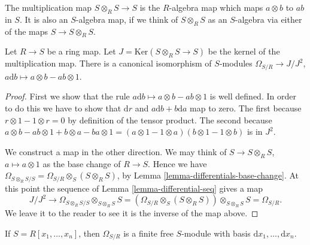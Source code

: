 \noindent
The multiplication map $S\otimes_R S \to S$ is the $R$-algebra
map which maps $a \otimes b$ to $ab$ in $S$. It is also an
$S$-algebra map, if we think of $S\otimes_R S$ as an $S$-algebra
via either of the maps $S \to S\otimes_R S$.

\begin{lemma}
\label{lemma-differentials-diagonal}
Let $R \to S$ be a ring map. Let $J = \text{Ker}(S\otimes_R S \to S)$
be the kernel of the multiplication map. There is a canonical
isomorphism of $S$-modules $\Omega_{S/R} \to J/J^2$,
$a \text{d} b \mapsto a\otimes b - ab\otimes 1$.
\end{lemma}

\begin{proof}
First we show that the rule $a \text{d} b \mapsto a\otimes b - ab\otimes 1$
is well defined. In order to do this we have to show
that $\text{d}r$ and $a\text{d}b + b \text{d}a$ map to zero.
The first because $r\otimes 1 - 1 \otimes r = 0$ by definition
of the tensor product. The second because
$a\otimes b - ab\otimes 1 + b\otimes a - ba\otimes 1
=
(a\otimes 1 - 1\otimes a)(b\otimes 1 - 1\otimes b)
$
is in $J^2$.

\medskip\noindent
We construct a map in the other direction.
We may think of $S \to S\otimes_R S$, $a \mapsto a\otimes 1$
as the base change of $R \to S$. Hence we have
$\Omega_{S\otimes_R S/S} = \Omega_{S/R} \otimes_S (S\otimes_R S)$,
by Lemma \ref{lemma-differentials-base-change}.
At this point the sequence of Lemma \ref{lemma-differential-seq} gives a map
$$
J/J^2  \to \Omega_{S\otimes_RS/ S} \otimes_{S\otimes_R S} S
= (\Omega_{S/R} \otimes_S (S\otimes_R S))\otimes_{S\otimes_R S} S
= \Omega_{S/R}.
$$
We leave it to the reader to see it is the inverse of the map
above.
\end{proof}




\begin{lemma}
\label{lemma-differentials-polynomial-ring}
If $S = R[x_1, \ldots, x_n]$, then
$\Omega_{S/R}$ is a finite free $S$-module with
basis $\text{d}x_1, \ldots, \text{d}x_n$.
\end{lemma}

